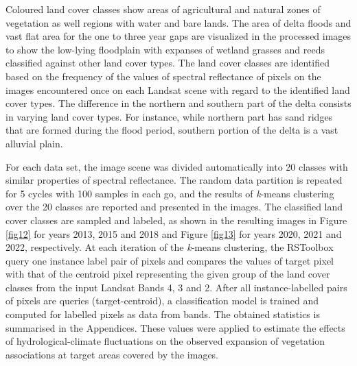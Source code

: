 \documentclass[12pt,a4paper,oneside]{article}
\def \newpar{\vspace{6pt}}
\begin{document}
\newpar Coloured land cover classes show areas of agricultural and natural zones of vegetation as well regions with water and bare lands. The area of delta floods and vast flat area for the one to three year gaps are visualized in the processed images to show the low-lying floodplain with expanses of wetland grasses and reeds classified against other land cover types. The land cover classes are identified based on the frequency of the values of spectral reflectance of pixels on the images encountered once on each Landsat scene with regard to the identified land cover types. The difference in the northern and southern part of the delta consists in varying land cover types. For instance, while northern part has sand ridges that are formed during the flood period, southern portion of the delta is a vast alluvial plain.

\newpar For each data set, the image scene was divided automatically into 20 classes with similar properties of spectral reflectance. The random data partition is repeated for 5 cycles with 100 samples in each go, and the results of \emph{k}-means clustering over the 20 classes are reported and presented in the images. The classified land cover classes are sampled and labeled, as shown in the resulting images in Figure \ref{fig12} for years 2013, 2015 and 2018 and Figure \ref{fig13} for years 2020, 2021 and 2022, respectively. At each iteration of the \emph{k}-means clustering, the RSToolbox query one instance label pair of pixels and compares the values of target pixel with that of the centroid pixel representing the given group of the land cover classes from the input Landsat Bands 4, 3 and 2. After all instance-labelled pairs of pixels are queries (target-centroid), a classification model is trained and computed for labelled pixels as data from bands. The obtained statistics is summarised in the Appendices. These values were applied to estimate the effects of hydrological-climate fluctuations on the observed expansion of vegetation associations at target areas covered by the images. 
\end{document}
